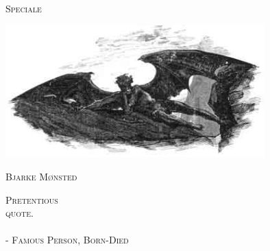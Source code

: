 

\begin{center}
\textsc{\Large Speciale}\\[0.5cm] %
%
\thesistitle

\includegraphics[width=0.75\textwidth]{pics/logo}%

\vfill 

\textsc{\huge Bjarke Mønsted}%
 
\end{center}
\thispagestyle{empty}

\clearpage
{\phantom{} \vspace{-7mm}}
\vspace{7cm}
\begin{center}
\textsc{
Pretentious  \\ quote.
}
\ \\
\ \\

\textsc{
- Famous Person, Born-Died
}
\end{center}
\thispagestyle{empty}

\clearpage



